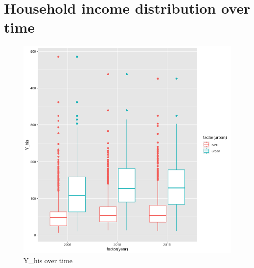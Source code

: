\documentclass[a4paper, 11pt]{article} %
\begin{document}
\section{Household income distribution over time} \label{sec:appendix_household_dist}
\begin{figure}[h!]
    \centering
    \includegraphics[scale=0.5]{figures/income_over_time} 
    \caption{Y\_his over time}
    \label{fig:income_over_time}
\end{figure}

\newpage
\end{document}
